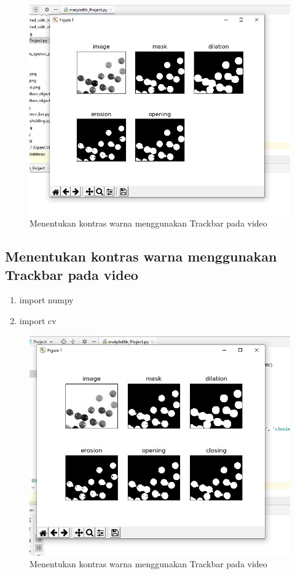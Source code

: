 \newpage
\begin{figure}[ht]
\centering
\includegraphics[scale=0.5]{figures/2,55.jpg}
\caption{Menentukan kontras warna menggunakan Trackbar pada video}
\label{contoh}
\end{figure}







\newpage
\subsection{Menentukan kontras warna menggunakan Trackbar pada video}

\begin{enumerate}
	\item import numpy
	\item import cv
\end{enumerate}

\newpage
\begin{figure}[ht]
\centering
\includegraphics[scale=0.5]{figures/2,56.jpg}
\caption{Menentukan kontras warna menggunakan Trackbar pada video}
\label{contoh}
\end{figure}






